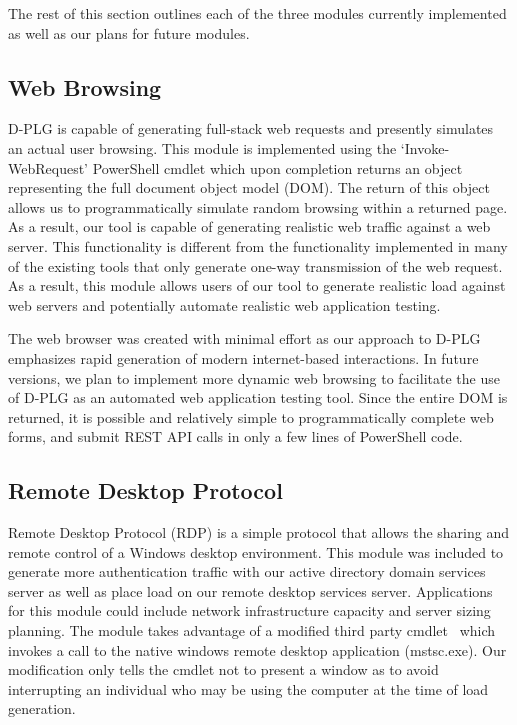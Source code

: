 The rest of this section outlines each of the three modules currently
implemented as well as our plans for future modules.

\subsection{Web Browsing} 
\noindent D-PLG is capable of generating full-stack web requests and presently
simulates an actual user browsing.  This module is implemented using the
`Invoke-WebRequest' PowerShell cmdlet which upon completion returns an object
representing the full document object model (DOM).  The return of this object
allows us to programmatically simulate random browsing within a returned page.
As a result, our tool is capable of generating realistic web traffic against a
web server.  This functionality is different from the functionality implemented
in many of the existing tools that only generate one-way transmission of the
web request.  As a result, this module allows users of our tool to generate
realistic load against web servers and potentially automate realistic web
application testing.

The web browser was created with minimal effort as our approach to D-PLG
emphasizes rapid generation of modern internet-based interactions.  In future
versions, we plan to implement more dynamic web browsing to facilitate the use
of D-PLG as an automated web application testing tool.  Since the entire DOM is
returned, it is possible and relatively simple to programmatically complete web
forms, and submit REST API calls in only a few lines of PowerShell code.
 
\subsection{Remote Desktop Protocol} 
\noindent Remote Desktop Protocol (RDP) is a simple protocol that allows the
sharing and remote control of a Windows desktop environment.  This module was
included to generate more authentication traffic with our active directory
domain services server as well as place load on our remote desktop services
server.  Applications for this module could include network infrastructure
capacity and server sizing planning.  The module takes advantage of a modified
third party cmdlet~\cite{brasser15} which invokes a call to the native windows
remote desktop application (mstsc.exe).  Our modification only tells the cmdlet
not to present a window as to avoid interrupting an individual who may be using
the computer at the time of load generation.

